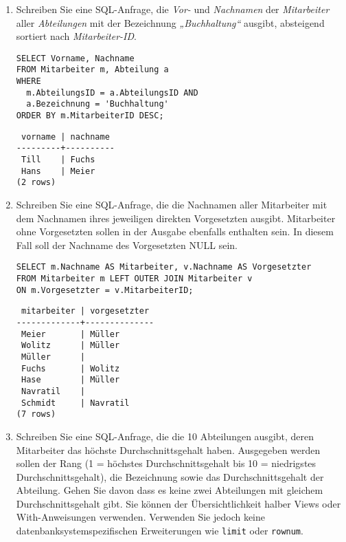 \documentclass{bschlangaul-aufgabe}
\begin{document}
\begin{enumerate}


\item Schreiben Sie eine SQL-Anfrage, die \emph{Vor-} und
\emph{Nachnamen} der \emph{Mitarbeiter} aller \emph{Abteilungen} mit der
Bezeichnung \emph{„Buchhaltung“} ausgibt, absteigend sortiert nach
\emph{Mitarbeiter-ID}.

\begin{bAntwort}
\begin{verbatim}
SELECT Vorname, Nachname
FROM Mitarbeiter m, Abteilung a
WHERE
  m.AbteilungsID = a.AbteilungsID AND
  a.Bezeichnung = 'Buchhaltung'
ORDER BY m.MitarbeiterID DESC;
\end{verbatim}

\begin{verbatim}
 vorname | nachname
---------+----------
 Till    | Fuchs
 Hans    | Meier
(2 rows)
\end{verbatim}
\end{bAntwort}


\item Schreiben Sie eine SQL-Anfrage, die die Nachnamen aller
Mitarbeiter mit dem Nachnamen ihres jeweiligen direkten Vorgesetzten
ausgibt. Mitarbeiter ohne Vorgesetzten sollen in der Ausgabe ebenfalls
enthalten sein. In diesem Fall soll der Nachname des Vorgesetzten NULL
sein.

\begin{bAntwort}
\begin{verbatim}
SELECT m.Nachname AS Mitarbeiter, v.Nachname AS Vorgesetzter
FROM Mitarbeiter m LEFT OUTER JOIN Mitarbeiter v
ON m.Vorgesetzter = v.MitarbeiterID;
\end{verbatim}

\begin{verbatim}
 mitarbeiter | vorgesetzter
-------------+--------------
 Meier       | Müller
 Wolitz      | Müller
 Müller      |
 Fuchs       | Wolitz
 Hase        | Müller
 Navratil    |
 Schmidt     | Navratil
(7 rows)
\end{verbatim}
\end{bAntwort}


\item Schreiben Sie eine SQL-Anfrage, die die 10 Abteilungen ausgibt,
deren Mitarbeiter das höchste Durchschnittsgehalt haben. Ausgegeben
werden sollen der Rang (1 = höchstes Durchschnittsgehalt bis 10 =
niedrigstes Durchschnittsgehalt), die Bezeichnung sowie das
Durchschnittsgehalt der Abteilung. Gehen Sie davon dass es keine zwei
Abteilungen mit gleichem Durchschnittsgehalt gibt. Sie können der
Übersichtlichkeit halber Views oder With-Anweisungen verwenden.
Verwenden Sie jedoch keine datenbanksystemspezifischen Erweiterungen wie
\verb|limit| oder \verb|rownum|.


\end{enumerate}
\end{document}
